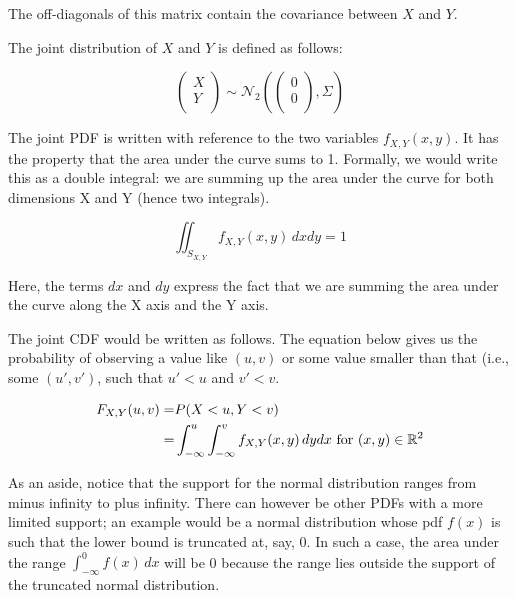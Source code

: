 \documentclass[12pt,]{krantz}
\theoremstyle{definition}
\theoremstyle{definition}
\theoremstyle{definition}
\theoremstyle{remark}
\begin{document}
The off-diagonals of this matrix contain the covariance between \(X\) and \(Y\).

The joint distribution of \(X\) and \(Y\) is defined as follows:

\begin{equation}\label{eq:jointpriordistfoundations}
\begin{pmatrix}
  X \\ 
  Y \\
\end{pmatrix}
\sim 
\mathcal{N}_2 \left(
\begin{pmatrix}
  0 \\
  0 \\
\end{pmatrix},
\Sigma
\right)
\end{equation}

The joint PDF is written with reference to the two variables \(f_{X,Y}(x,y)\). It has the property that the area under the curve sums to 1. Formally, we would write this as a double integral: we are summing up the area under the curve for both dimensions X and Y (hence two integrals).

\begin{equation}
\iint_{S_{X,Y}} f_{X,Y}(x,y)\, dx dy = 1
\end{equation}

Here, the terms \(dx\) and \(dy\) express the fact that we are summing the area under the curve along the X axis and the Y axis.

The joint CDF would be written as follows. The equation below gives us the probability of observing a value like \((u,v)\) or some value smaller than that (i.e., some \((u',v')\), such that \(u'<u\) and \(v'<v\).

\begin{equation}
\begin{split}
F_{X,Y}(u,v) =& P(X<u,Y<v)\\
             =& \int_{-\infty}^u \int_{-\infty}^v f_{X,Y}(x,y)\, dy dx \hbox{ for } (x,y)\in \mathbb{R}^2\\
\end{split}
\end{equation}

As an aside, notice that the support for the normal distribution ranges from minus infinity to plus infinity. There can however be other PDFs with a more limited support; an example would be a normal distribution whose pdf \(f(x)\) is such that the lower bound is truncated at, say, 0. In such a case, the area under the range \(\int_{-\infty}^0 f(x) \, dx\) will be 0 because the range lies outside the support of the truncated normal distribution.
\end{document}
